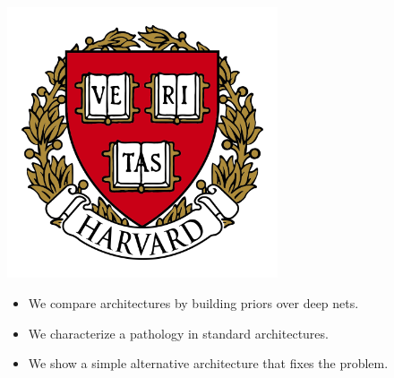 \documentclass[portrait,a0b,final,a4resizeable]{include/a0poster}
\def\jointspacing{\vspace{0.3in}}
\begin{document}
\begin{poster}
\begin{center}
\begin{pcolumn}{1.03}
{{\begin{minipage}[c]{\logowidth}
\begin{flushright}
    \includegraphics[width=8cm,trim=2em 0em 2em 2em, clip]{badges/harvard}
  \end{flushright}
\end{minipage}}
%
}
\end{pcolumn}
\end{center}

\vspace*{3cm}

\large



\Large

\begin{multicols}{2}



\vspace*{-1.5cm}
\null\hspace*{3cm}\begin{minipage}[c]{0.8\columnwidth}
\centering
\begin{itemize}
\item We compare architectures by building priors over deep nets.
\item We characterize a pathology in standard architectures.
\item We show a simple alternative architecture that fixes the problem.
\end{itemize}
\end{minipage}

\jointspacing


\center
\begin{centering}

\end{centering}



\end{multicols}
\end{poster}
\end{document}
